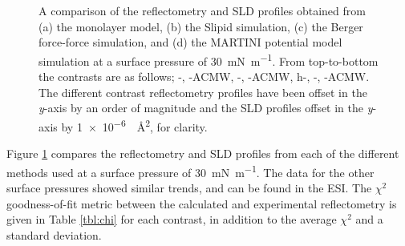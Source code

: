 \documentclass[amsmath,amssymb,twocolumn,superscriptaddress]{revtex4-1}
\begin{document}
\begin{figure}
 \caption{A comparison of the reflectometry and SLD profiles obtained from (a) the monolayer model, (b) the Slipid simulation, (c) the Berger force-force simulation, and (d) the MARTINI potential model simulation at a surface pressure of \SI{30}{\milli\newton\per\meter}. From top-to-bottom the contrasts are as follows; -, -ACMW, -, -ACMW, h-, -, -ACMW. The different contrast reflectometry profiles have been offset in the \emph{y}-axis by an order of magnitude and the SLD profiles offset in the \emph{y}-axis by \SI{1e-6}{\per\square\angstrom}, for clarity.}
 \label{fig:ref}
\end{figure}
%
Figure \ref{fig:ref} compares the reflectometry and SLD profiles from each of the different methods used at a surface pressure of \SI{30}{\milli\newton\per\meter}.
The data for the other surface pressures showed similar trends, and can be found in the ESI.
The $\chi^2$ goodness-of-fit metric between the calculated and experimental reflectometry is given in Table \ref{tbl:chi} for each contrast, in addition to the average $\chi^2$ and a standard deviation.
%
\end{document}
